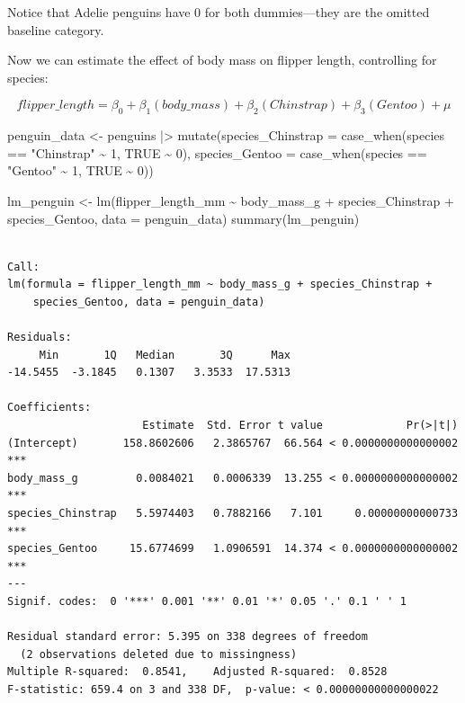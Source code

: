 \documentclass[
  letterpaper,
  DIV=11,
  numbers=noendperiod]{scrreprt}
\newenvironment{Shaded}{\begin{snugshade}}{\end{snugshade}}
\newcommand{\AttributeTok}[1]{\textcolor[rgb]{0.40,0.45,0.13}{#1}}
\newcommand{\ConstantTok}[1]{\textcolor[rgb]{0.56,0.35,0.01}{#1}}
\newcommand{\DecValTok}[1]{\textcolor[rgb]{0.68,0.00,0.00}{#1}}
\newcommand{\FunctionTok}[1]{\textcolor[rgb]{0.28,0.35,0.67}{#1}}
\newcommand{\NormalTok}[1]{\textcolor[rgb]{0.00,0.23,0.31}{#1}}
\newcommand{\OtherTok}[1]{\textcolor[rgb]{0.00,0.23,0.31}{#1}}
\newcommand{\SpecialCharTok}[1]{\textcolor[rgb]{0.37,0.37,0.37}{#1}}
\newcommand{\StringTok}[1]{\textcolor[rgb]{0.13,0.47,0.30}{#1}}
\begin{document}
Notice that Adelie penguins have 0 for both dummies---they are the
omitted baseline category.

Now we can estimate the effect of body mass on flipper length,
controlling for species:

\[
flipper\_length = \beta_0 + \beta_1(body\_mass) + \beta_2(Chinstrap) + \beta_3(Gentoo) + \mu
\]

\begin{Shaded}
\begin{Highlighting}[]
\NormalTok{penguin\_data }\OtherTok{\textless{}{-}}\NormalTok{ penguins }\SpecialCharTok{|\textgreater{}} 
    \FunctionTok{mutate}\NormalTok{(}\AttributeTok{species\_Chinstrap =} \FunctionTok{case\_when}\NormalTok{(species }\SpecialCharTok{==} \StringTok{"Chinstrap"} \SpecialCharTok{\textasciitilde{}} \DecValTok{1}\NormalTok{, }\ConstantTok{TRUE} \SpecialCharTok{\textasciitilde{}} \DecValTok{0}\NormalTok{),}
           \AttributeTok{species\_Gentoo =} \FunctionTok{case\_when}\NormalTok{(species }\SpecialCharTok{==} \StringTok{"Gentoo"} \SpecialCharTok{\textasciitilde{}} \DecValTok{1}\NormalTok{, }\ConstantTok{TRUE} \SpecialCharTok{\textasciitilde{}} \DecValTok{0}\NormalTok{))}

\NormalTok{lm\_penguin }\OtherTok{\textless{}{-}} \FunctionTok{lm}\NormalTok{(flipper\_length\_mm }\SpecialCharTok{\textasciitilde{}}\NormalTok{ body\_mass\_g }\SpecialCharTok{+}\NormalTok{ species\_Chinstrap }\SpecialCharTok{+}\NormalTok{ species\_Gentoo, }
                 \AttributeTok{data =}\NormalTok{ penguin\_data)}
\FunctionTok{summary}\NormalTok{(lm\_penguin)}
\end{Highlighting}
\end{Shaded}

\begin{verbatim}

Call:
lm(formula = flipper_length_mm ~ body_mass_g + species_Chinstrap + 
    species_Gentoo, data = penguin_data)

Residuals:
     Min       1Q   Median       3Q      Max 
-14.5455  -3.1845   0.1307   3.3533  17.5313 

Coefficients:
                     Estimate  Std. Error t value             Pr(>|t|)    
(Intercept)       158.8602606   2.3865767  66.564 < 0.0000000000000002 ***
body_mass_g         0.0084021   0.0006339  13.255 < 0.0000000000000002 ***
species_Chinstrap   5.5974403   0.7882166   7.101     0.00000000000733 ***
species_Gentoo     15.6774699   1.0906591  14.374 < 0.0000000000000002 ***
---
Signif. codes:  0 '***' 0.001 '**' 0.01 '*' 0.05 '.' 0.1 ' ' 1

Residual standard error: 5.395 on 338 degrees of freedom
  (2 observations deleted due to missingness)
Multiple R-squared:  0.8541,    Adjusted R-squared:  0.8528 
F-statistic: 659.4 on 3 and 338 DF,  p-value: < 0.00000000000000022
\end{verbatim}
\end{document}
